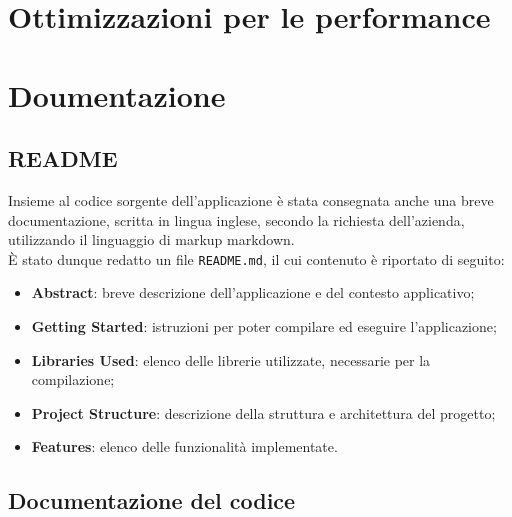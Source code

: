 \section{Ottimizzazioni per le performance}
\label{sec:performance}




\section{Doumentazione}
\label{sec:documentation}

\subsection*{README}
\label{sec:readme}

Insieme al codice sorgente dell'applicazione è stata consegnata anche una breve documentazione, scritta in lingua inglese, secondo la richiesta dell'azienda, utilizzando il linguaggio di markup \gls{markdown}\glsoccur.\\
È stato dunque redatto un file \lstinline{README.md}, il cui contenuto è riportato di seguito:
\begin{itemize}
    \item \textbf{Abstract}: breve descrizione dell'applicazione e del contesto applicativo;
    \item \textbf{Getting Started}: istruzioni per poter compilare ed eseguire l'applicazione;
    \item \textbf{Libraries Used}: elenco delle librerie utilizzate, necessarie per la compilazione;
    \item \textbf{Project Structure}: descrizione della struttura e architettura del progetto;
    \item \textbf{Features}: elenco delle funzionalità implementate.
\end{itemize}


\subsection*{Documentazione del codice}
\label{sec:documentazione-codice}

